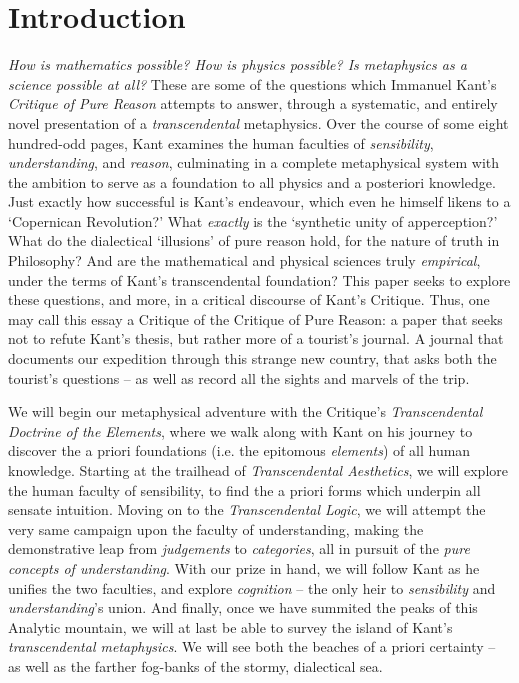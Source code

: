 \section*{Introduction}
\emph{How is mathematics possible? How is physics possible? Is metaphysics as a science possible at all?} These are some of the questions which Immanuel Kant's \emph{Critique of Pure Reason} attempts to answer, through a systematic, and entirely novel presentation of a \emph{transcendental} metaphysics. Over the course of some eight hundred-odd pages, Kant examines the human faculties of \emph{sensibility}, \emph{understanding}, and \emph{reason}, culminating in a complete metaphysical system with the ambition to serve as a foundation to all physics and a posteriori knowledge. Just exactly how successful is Kant's endeavour, which even he himself likens to a `Copernican Revolution?' What \emph{exactly} is the `synthetic unity of apperception?' What do the dialectical `illusions' of pure reason hold, for the nature of truth in Philosophy? And are the mathematical and physical sciences truly \emph{empirical}, under the terms of Kant's transcendental foundation? This paper seeks to explore these questions, and more, in a critical discourse of Kant's Critique. Thus, one may call this essay a Critique of the Critique of Pure Reason: a paper that seeks not to refute Kant's thesis, but rather more of a tourist's journal. A journal that documents our expedition through this strange new country, that asks both the tourist's questions -- as well as record all the sights and marvels of the trip.

We will begin our metaphysical adventure with the Critique's \emph{Transcendental Doctrine of the Elements}, where we walk along with Kant on his journey to discover the a priori foundations (i.e. the epitomous \emph{elements}) of all human knowledge. Starting at the trailhead of \emph{Transcendental Aesthetics}, we will explore the human faculty of sensibility, to find the a priori forms which underpin all sensate intuition. Moving on to the \emph{Transcendental Logic}, we will attempt the very same campaign upon the faculty of understanding, making the demonstrative leap from \emph{judgements} to \emph{categories}, all in pursuit of the \emph{pure concepts of understanding}. With our prize in hand, we will follow Kant as he unifies the two faculties, and explore \emph{cognition} -- the only heir to \emph{sensibility} and \emph{understanding}'s union. And finally, once we have summited the peaks of this Analytic mountain, we will at last be able to survey the island of Kant's \emph{transcendental metaphysics}. We will see both the beaches of a priori certainty -- as well as the farther fog-banks of the stormy, dialectical sea.
